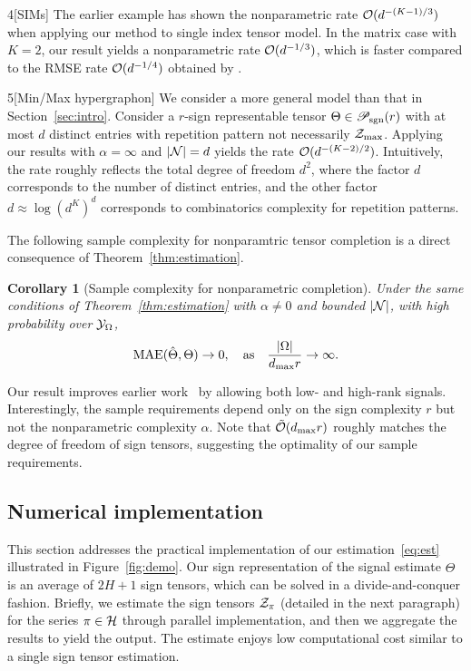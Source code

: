 \documentclass[useAMS,usenatbib,usegraphicx,referee]{biom}
\theoremstyle{plain}
\newtheorem{cor}{Corollary}
\theoremstyle{definition}
\def\caliP{\mathscr{P}_{\textup{sgn}}}
\begin{document}
\begin{customexample}{4}[SIMs]
The earlier example has shown the nonparametric rate $\mathcal{O}(d^{-(K-1)/3})$ when applying our method to single index tensor model. In the matrix case with $K=2$, our result yields a nonparametric rate $\mathcal{O}(d^{-1/3})$, which is faster compared to the RMSE rate $\mathcal{O}(d^{-1/4})$ obtained by \cite{ganti2015matrix}. 

\end{customexample}

\begin{customexample}{5}[Min/Max hypergraphon]
We consider a more general model than that in Section~\ref{sec:intro}. Consider a $r$-sign representable tensor $\Theta\in \caliP(r)$ with at most $d$ distinct entries with repetition pattern not necessarily $\mathcal{Z}_{\max}$. Applying our results with $\alpha=\infty$ and $|\mathcal{N}|=d$ yields the rate $\mathcal{O}(d^{-(K-2)/2})$. Intuitively, the rate roughly reflects the total degree of freedom $d^2$, where the factor $d$ corresponds to the number of distinct entries, and the other factor $d\approx \log (d^K)^d$ corresponds to combinatorics complexity for repetition patterns. 
\end{customexample}

The following sample complexity for nonparamtric tensor completion is a direct consequence of Theorem~\ref{thm:estimation}. 
\vspace{-.3cm}

\begin{cor}[Sample complexity for nonparametric completion] Under the same conditions of Theorem~\ref{thm:estimation} with $\alpha\neq 0$ and bounded $|\mathcal{N}|$, with high probability over $\mathcal{Y}_\Omega$, 
\[
\textup{MAE}(\hat \Theta, \Theta)\to 0, \quad \text{as}\quad {|\Omega|\over {d_{\max}} r}\to \infty.
\]
\end{cor}
Our result improves earlier work~\citep{yuan2016tensor,ghadermarzy2019near,pmlr-v119-lee20i} by allowing both low- and high-rank signals. Interestingly, the sample requirements depend only on the sign complexity $r$ but not the nonparametric complexity $\alpha$. Note that $\tilde {\mathcal{O}}(d_{\max}r)$ roughly matches the degree of freedom of sign tensors, suggesting the optimality of our sample requirements. 

\subsection{Numerical implementation}
This section addresses the practical implementation of our estimation~\eqref{eq:est} illustrated in Figure~\ref{fig:demo}. Our sign representation of the signal estimate $\hat \Theta$ is an average of $2H+1$ sign tensors, which can be solved in a divide-and-conquer fashion. Briefly, we estimate the sign tensors $\mathcal{Z}_\pi$ (detailed in the next paragraph) for the series $\pi \in \mathcal{H}$ through parallel implementation, and then we aggregate the results to yield the output. The estimate enjoys low computational cost similar to a single sign tensor estimation.  
\end{document}
